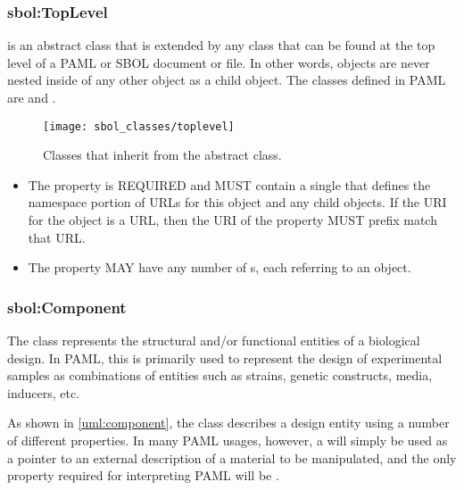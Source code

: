 \subsubsection{sbol:TopLevel}
\label{sec:sbol:TopLevel}

 is an abstract class that is extended by any  class that can be found at the top level of a PAML or SBOL document or file.
In other words,  objects are never nested inside of any other object as a child object.
The  classes defined in PAML are  and . 

\begin{figure}[ht]
\begin{center}
\texttt{[image: sbol\_classes/toplevel]}
\caption[]{Classes that inherit from the  abstract class.}
\label{uml:toplevel}
\end{center}
\end{figure}

\begin{itemize}
\item \label{sec:sbol:hasNamespace}
The  property is REQUIRED and MUST contain a single  that defines the namespace portion of URLs for this object and any child objects.
If the URI for the  object is a URL, then the URI of the  property MUST prefix match that URL.

\item 
\label{sec:sbol:hasAttachment}
The  property MAY have any number of s, each referring to an  object.
\end{itemize}


\subsubsection{sbol:Component}
\label{sec:sbol:Component}

The  class represents the structural and/or functional entities of a biological design. 
In PAML, this is primarily used to represent the design of experimental samples as combinations of entities such as strains, genetic constructs, media, inducers, etc.

As shown in \ref{uml:component}, the  class describes a design entity using a number of different properties.
In many PAML usages, however, a  will simply be used as a pointer to an external description of a material to be manipulated, and the only property required for interpreting PAML will be .

